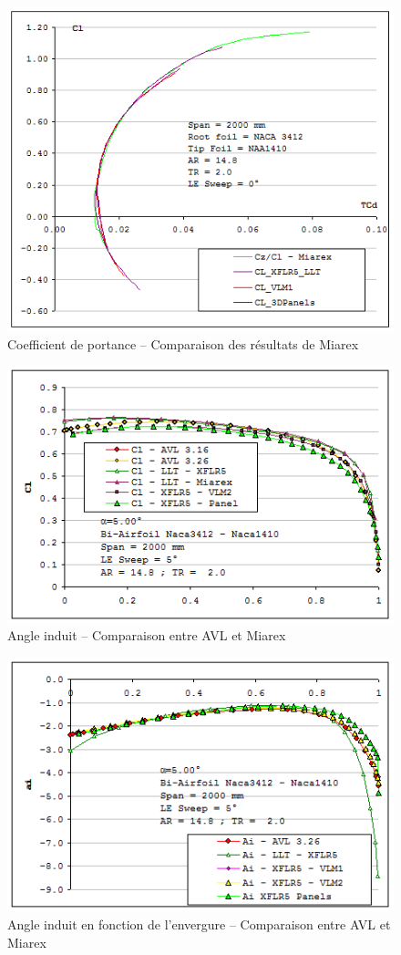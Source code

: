 \documentclass[a4paper,twoside,12pt,dvips]{article}
\begin{document}
\begin{figure}[!ht]
  \centering
  \includegraphics[width=0.8\linewidth]{img-40}
  \caption{Coefficient de portance – Comparaison des résultats de Miarex}
  \label{img:comparaison_AVL_miarex_coefficient_portance}
\end{figure}

\begin{figure}[!ht]
  \centering
  \includegraphics[width=0.8\linewidth]{img-41}
  \caption{Angle induit – Comparaison entre AVL et Miarex}
  \label{img:comparaison_AVL_miarex_angle_induit}
\end{figure}

\begin{figure}[!ht]
  \centering
  \includegraphics[width=0.8\linewidth]{img-42}
  \caption{Angle induit en fonction de l’envergure – Comparaison entre AVL et 
  Miarex}
  \label{img:comparaison_AVL_miarex_angle_induit_envergure}
\end{figure}
\end{document}
